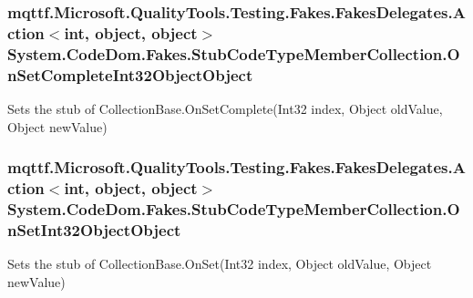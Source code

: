 \hypertarget{class_system_1_1_code_dom_1_1_fakes_1_1_stub_code_type_member_collection_a6060e44e79852f57c8554634cfbe4c84}{
\subsubsection[{On\-Set\-Complete\-Int32\-Object\-Object}]{\setlength{\rightskip}{0pt plus 5cm}mqttf.\-Microsoft.\-Quality\-Tools.\-Testing.\-Fakes.\-Fakes\-Delegates.\-Action$<$int, object, object$>$ System.\-Code\-Dom.\-Fakes.\-Stub\-Code\-Type\-Member\-Collection.\-On\-Set\-Complete\-Int32\-Object\-Object}}\label{class_system_1_1_code_dom_1_1_fakes_1_1_stub_code_type_member_collection_a6060e44e79852f57c8554634cfbe4c84}


Sets the stub of Collection\-Base.\-On\-Set\-Complete(\-Int32 index, Object old\-Value, Object new\-Value)

\hypertarget{class_system_1_1_code_dom_1_1_fakes_1_1_stub_code_type_member_collection_a6f13a016796d339c2b1c5a6926264d63}{
\subsubsection[{On\-Set\-Int32\-Object\-Object}]{\setlength{\rightskip}{0pt plus 5cm}mqttf.\-Microsoft.\-Quality\-Tools.\-Testing.\-Fakes.\-Fakes\-Delegates.\-Action$<$int, object, object$>$ System.\-Code\-Dom.\-Fakes.\-Stub\-Code\-Type\-Member\-Collection.\-On\-Set\-Int32\-Object\-Object}}\label{class_system_1_1_code_dom_1_1_fakes_1_1_stub_code_type_member_collection_a6f13a016796d339c2b1c5a6926264d63}


Sets the stub of Collection\-Base.\-On\-Set(\-Int32 index, Object old\-Value, Object new\-Value)

